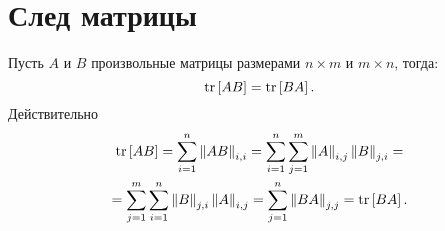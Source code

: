\section{След матрицы}

Пусть $A$ и $B$ произвольные матрицы размерами $n \times m$ и $m \times n$, тогда:
$$
    \mathrm{tr} \left [ A B \right ] = \mathrm{tr} \left [ B A \right ].
$$
Действительно
\begin{multline} \label{equation:filtering:appendix:trace:commutation}
    \mathrm{tr} \left [ A B \right ]
        = \sum_{i=1}^n \left \| A B \right \|_{i,i}
        = \sum_{i=1}^n \sum_{j=1}^m \left \| A \right \|_{i,j} \left \| B \right \|_{j,i} = \\
    = \sum_{j=1}^m \sum_{i=1}^n \left \| B \right \|_{j,i} \left \| A \right \|_{i,j}
        = \sum_{j=1}^n \left \| B A \right \|_{j,j}
        = \mathrm{tr} \left [ B A \right ]
    .
\end{multline}